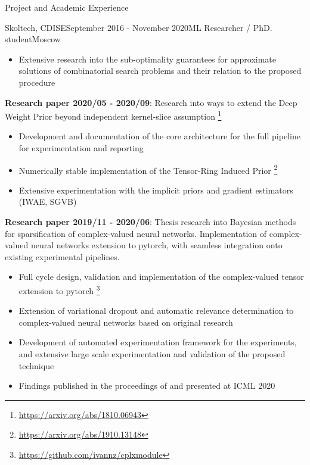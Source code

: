 \documentclass{resume} %
\begin{document}
\begin{rSection}{Project and Academic Experience}
\begin{rSubsection}{Skoltech, CDISE}{September 2016 - November 2020}{ML Researcher / PhD. student}{Moscow}
\begin{itemize}
        \item Extensive research into the sub-optimality guarantees for approximate solutions
        of combinatorial search problems and their relation to the proposed procedure
    \end{itemize}

    \medskip
    \item \textbf{Research paper 2020/05 - 2020/09}:
    Research into ways to extend the Deep Weight Prior beyond independent kernel-slice assumption%
        \footnote{\url{https://arxiv.org/abs/1810.06943}}
    \begin{itemize}
        \item Development and documentation of the core architecture for the full pipeline for
        experimentation and reporting
        
        \item Numerically stable implementation of the Tensor-Ring Induced Prior%
            \footnote{\url{https://arxiv.org/abs/1910.13148}}
        
        \item Extensive experimentation with the implicit priors and gradient estimators (IWAE, SGVB)
    \end{itemize}

    \medskip
    \item \textbf{Research paper 2019/11 - 2020/06}:
    Thesis research into Bayesian methods for sparsification of complex-valued neural networks.
    Implementation of complex-valued neural networks extension to pytorch, with seamless
    integration onto existing experimental pipelines. \begin{itemize}
        \item Full cycle design, validation and implementation of the complex-valued tensor
        extension to pytorch%
            \footnote{\url{https://github.com/ivannz/cplxmodule}}
        
        \item Extension of variational dropout and automatic relevance determination to
        complex-valued neural networks based on original research
        
        \item Development of automated experimentation framework for the experiments, and
        extensive large scale experimentation and validation of the proposed technique
        
        \item Findings published in the proceedings of and presented at ICML 2020
    \end{itemize}


\end{rSubsection}
\end{rSection}
\end{document}
